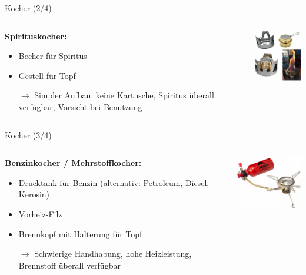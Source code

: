 \documentclass[aspectratio=169]{beamer}
\newcommand{\sarrow}{\small$\rightarrow$}
\begin{document}
			\begin{frame}{Kocher (2/4)}
				\begin{columns}[c]
					\begin{column}{0.69\textwidth}
						\textbf{Spirituskocher:}
						\begin{itemize}
							\item Becher für Spiritus
							\item Gestell für Topf
							\item[\sarrow] Simpler Aufbau, keine Kartusche, Spiritus überall verfügbar, Vorsicht bei Benutzung
						\end{itemize}
					\end{column}
					\begin{column}{0.29\textwidth}
						\includegraphics[width=3cm]{images/kocher-spiritus.png}
					\end{column}
				\end{columns}
			\end{frame}
		
			\begin{frame}{Kocher (3/4)}
				\begin{columns}[c]
					\begin{column}{0.62\textwidth}
						\textbf{Benzinkocher / Mehrstoffkocher:}
						\begin{itemize}
							\item Drucktank für Benzin (alternativ: Petroleum, Diesel, Kerosin)
							\item Vorheiz-Filz
							\item Brennkopf mit Halterung für Topf
							\item[\sarrow] Schwierige Handhabung, hohe Heizleistung, Brennstoff überall verfügbar
						\end{itemize}
					\end{column}
					\begin{column}{0.36\textwidth}
						\includegraphics[width=3.85cm]{images/kocher-benzin.png}
					\end{column}
				\end{columns}
			\end{frame}
		
\end{document}
